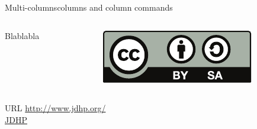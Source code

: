 \begin{frame}{Multi-columns}{columns and column commands}
    \begin{columns}
        \begin{column}{0.5\textwidth}

            Blablabla

        \end{column}
        \begin{column}{0.5\textwidth}

            \begin{center}
                \includegraphics[width=.99\linewidth]{figs/test}
            \end{center}

        \end{column}
    \end{columns}
\end{frame}
\note{
}


\begin{frame}{URL}
    \url{http://www.jdhp.org/}  \\
    \href{http://www.jdhp.org/}{JDHP}
\end{frame}
\note{
}

